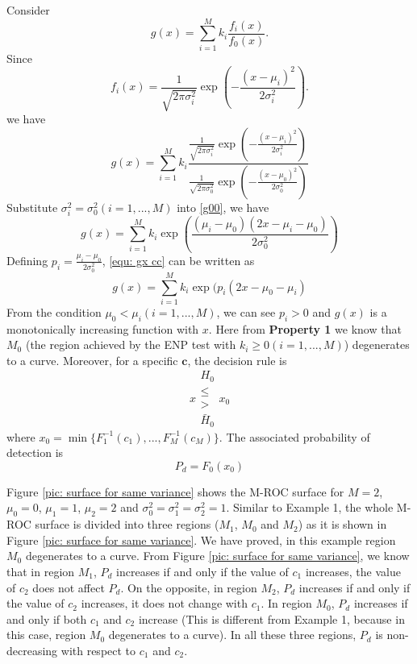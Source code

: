 Consider
\begin{equation}
\label{equ: define gx}
g(x) = \sum_{i=1}^{M}k_i\frac{f_i(x)}{f_0(x)}.
\end{equation}
Since 
\begin{equation}
\label{equ: gaussian PDF}
f_i(x) = \frac{1}{\sqrt{2\pi\sigma_i^2}}\exp(-\frac{(x-\mu_i)^2}{2\sigma_i^2}).
\end{equation}
we have
\begin{equation}
\label{g00}
g(x) = \sum_{i=1}^{M}k_i\frac{\frac{1}{\sqrt{2\pi\sigma_i^2}}\exp(-\frac{(x-\mu_i)^2}{2\sigma_i^2})}{\frac{1}{\sqrt{2\pi\sigma_0^2}}\exp(-\frac{(x-\mu_0)^2}{2\sigma_0^2})}
\end{equation}
Substitute  $\sigma_i^2 = \sigma_0^2 (i = 1, ..., M)$ into \eqref{g00}, we have 
\begin{equation}
\label{equ: gx cc}
g(x) = \sum_{i=1}^{M}k_i\exp(\frac{(\mu_i - \mu_0)(2x-\mu_i - \mu_0)}{2\sigma_0^2})
\end{equation}
Defining $p_i = \frac{\mu_i - \mu_0}{2\sigma_0^2}$, \eqref{equ: gx cc} can be written as
\begin{equation}
g(x) = \sum_{i=1}^{M}k_i\exp(p_i(2x-\mu_0 - \mu_i)
\end{equation}
From the condition $\mu_0 < \mu_i (i=1, ..., M)$, we can see $p_i >0$ and  $g(x)$ is a monotonically increasing function with $x$. Here from \textbf{Property 1} we know that $M_0$ (the region achieved by the ENP test with $k_i \geq 0 (i=1, ..., M)$) degenerates to a curve. Moreover, for a specific $\mathbf{c}$, the decision rule is 
\[
x \substack{H_0 \\ \leq \\ > \\ \bar{H}_0} x_0
\]
where $x_0 = \min\{F_1^{-1}(c_1), ..., F_M^{-1}(c_M)\}$. The associated probability of detection is
\[
P_d = F_0(x_0)
\]

Figure \ref{pic: surface for same variance} shows the M-ROC surface for $M=2$, $\mu_0 = 0$, $\mu_1 = 1$, $\mu_2 = 2$ and $\sigma_0^2 = \sigma_1^2 = \sigma_2^2 = 1$. 
Similar to Example 1, the whole M-ROC surface is divided into three regions ($M_1$, $M_0$ and $M_2$) as it is shown in Figure \ref{pic: surface for same variance}.  We have proved, in this example region $M_0$ degenerates to a curve.  
From Figure \ref{pic: surface for same variance}, we know that in region $M_1$, $P_d$ increases if and only if the value of $c_1$ increases, the value of $c_2$ does not affect $P_d$. On the opposite, in region $M_2$, $P_d$ increases if and only if the value of $c_2$ increases, it does not change with $c_1$. In region $M_0$, $P_d$ increases if and only if both $c_1$ and $c_2$ increase (This is different from Example 1, because in this case, region $M_0$ degenerates to a curve). 
In all these three regions, $P_d$ is non-decreasing with respect to $c_1$ and $c_2$. 


